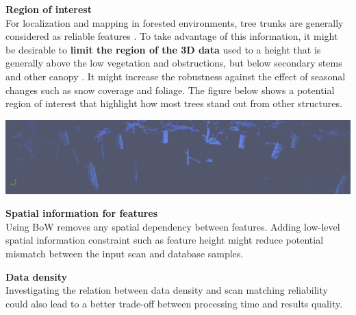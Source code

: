 \documentclass[a0paper,portrait]{baposter}
\begin{document}
\begin{poster}
{        \textbf{Region of interest}\\
        For localization and mapping in forested environments, tree trunks are generally considered as reliable features \cite{Song2012}. To take advantage of this information, it might be desirable to \textbf{limit the region of the 3D data} used to a height that is generally above the low vegetation and obstructions, but below secondary stems and other canopy \cite{Mcdaniel2012}. It might increase the robustness against the effect of seasonal changes such as snow coverage and foliage. The figure below shows a potential region of interest that highlight how most trees stand out from other structures.
        \begin{center}
            \includegraphics[width=0.95\linewidth]{./figures/pointcloudSlice.png}
        \end{center}

        \textbf{Spatial information for features}\\
        Using BoW removes any spatial dependency between features. Adding low-level spatial information constraint such as feature height might reduce potential mismatch between the input scan and database samples.\vspace{1em}

        \textbf{Data density}\\
        Investigating the relation between data density and scan matching reliability could also lead to a better trade-off between processing time and results quality.\vspace{1em}

}
\end{poster}
\end{document}
